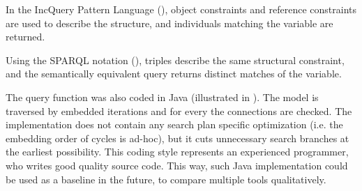 % 
% 
% 

In the IncQuery Pattern Language \cite{IQlanguage} (), object constraints and reference constraints are used to describe the structure, and individuals matching the  variable are returned.

Using the SPARQL \cite{Sparql} notation (), triples describe the same structural constraint, and the semantically equivalent query returns distinct matches of the  variable.

The query function was also coded in Java (illustrated in ). The model is traversed by embedded iterations and for every  the connections are checked. The implementation does not contain any search plan specific optimization (i.e. the embedding order of  cycles is ad-hoc), but it cuts unnecessary search branches at the earliest possibility.  This coding style represents an experienced programmer, who writes good quality source code. This way, such Java implementation could be used as a baseline in the future, to compare multiple tools qualitatively.



